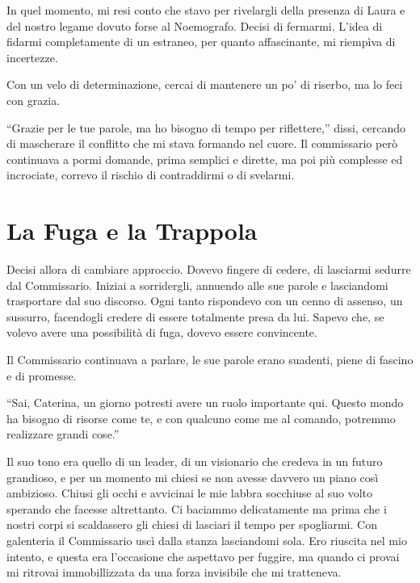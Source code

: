 In quel momento, mi resi conto che stavo per rivelargli della presenza di Laura e del nostro legame dovuto forse al Noemografo. Decisi di fermarmi. L'idea di fidarmi completamente di un estraneo, per quanto affascinante, mi riempìva di incertezze.

Con un velo di determinazione, cercai di mantenere un po' di riserbo, ma lo feci con grazia.

\begin{dialogue}
 \enquote{Grazie per le tue parole, ma ho bisogno di tempo per riflettere,} dissi, cercando di mascherare il conflitto che mi stava formando nel cuore. Il commissario però continuava a pormi domande, prima semplici e dirette, ma poi più complesse ed incrociate, correvo il rischio di contraddirmi o di svelarmi.
\end{dialogue}

\section{La Fuga e la Trappola}

Decisi allora di cambiare approccio. Dovevo fingere di cedere, di lasciarmi sedurre dal Commissario. Iniziai a sorridergli, annuendo alle sue parole e lasciandomi trasportare dal suo discorso. Ogni tanto rispondevo con un cenno di assenso, un sussurro, facendogli credere di essere totalmente presa da lui. Sapevo che, se volevo avere una possibilità di fuga, dovevo essere convincente.

Il Commissario continuava a parlare, le sue parole erano suadenti, piene di fascino e di promesse.

\begin{dialogue}
 \enquote{Sai, Caterina, un giorno potresti avere un ruolo importante qui. Questo mondo ha bisogno di risorse come te, e con qualcuno come me al comando, potremmo realizzare grandi cose.}
\end{dialogue}

Il suo tono era quello di un leader, di un visionario che credeva in un futuro grandioso, e per un momento mi chiesi se non avesse davvero un piano così ambizioso.
Chiusi gli occhi e avvicinai le mie labbra socchiuse al suo volto sperando che facesse altrettanto. Ci baciammo delicatamente ma prima che i nostri corpi si scaldassero gli chiesi di lasciari il tempo per spogliarmi. Con galenteria il Commissario uscì dalla stanza lasciandomi sola. Ero riuscita nel mio intento, e questa era l'occasione che aspettavo per fuggire,  ma quando ci provai  mi ritrovai immobillizzata da una forza invisibile che mi tratteneva.

